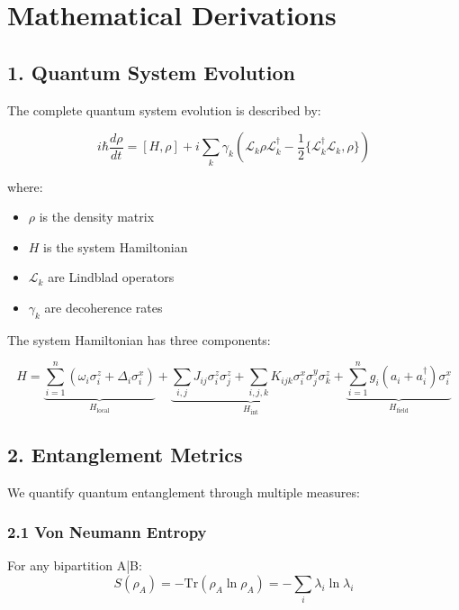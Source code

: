 
\section*{Mathematical Derivations}

\subsection*{1. Quantum System Evolution}

The complete quantum system evolution is described by:

\begin{equation}
    i\hbar\frac{d\rho}{dt} = [H, \rho] + i\sum_k \gamma_k(\mathcal{L}_k\rho\mathcal{L}_k^\dagger - \frac{1}{2}\{\mathcal{L}_k^\dagger\mathcal{L}_k, \rho\})
\end{equation}

where:
\begin{itemize}
    \item $\rho$ is the density matrix
    \item $H$ is the system Hamiltonian
    \item $\mathcal{L}_k$ are Lindblad operators
    \item $\gamma_k$ are decoherence rates
\end{itemize}

The system Hamiltonian has three components:

\begin{equation}
    H = \underbrace{\sum_{i=1}^n \left(\omega_i\sigma_i^z + \Delta_i\sigma_i^x\right)}_{H_{\text{local}}} + 
    \underbrace{\sum_{i,j} J_{ij}\sigma_i^z\sigma_j^z + \sum_{i,j,k} K_{ijk}\sigma_i^x\sigma_j^y\sigma_k^z}_{H_{\text{int}}} +
    \underbrace{\sum_{i=1}^n g_i(a_i + a_i^\dagger)\sigma_i^x}_{H_{\text{field}}}
\end{equation}

\subsection*{2. Entanglement Metrics}

We quantify quantum entanglement through multiple measures:

\subsubsection*{2.1 Von Neumann Entropy}
For any bipartition A|B:
\begin{equation}
    S(\rho_A) = -\text{Tr}(\rho_A\ln\rho_A) = -\sum_i \lambda_i\ln\lambda_i
\end{equation}

